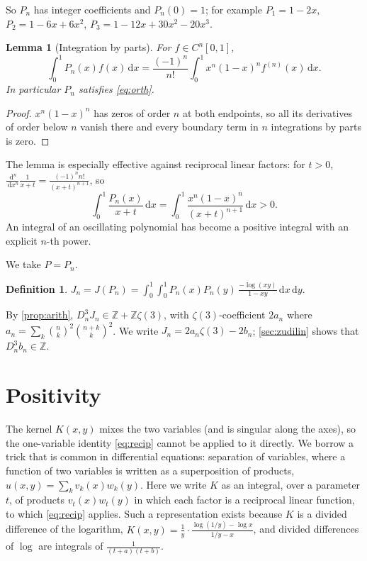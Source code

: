 \documentclass[11pt]{article}
\newcommand{\Z}{\mathbb{Z}}
\newcommand{\dd}{\,\mathrm{d}}
\newcommand{\Dn}{D_n}
\theoremstyle{plain}
\newtheorem{lemma}[theorem]{Lemma}
\theoremstyle{definition}
\newtheorem{definition}[theorem]{Definition}
\theoremstyle{remark}
\begin{document}
So $P_n$ has integer coefficients and $P_n(0)=1$; for example $P_1=1-2x$, $P_2=1-6x+6x^2$,
$P_3=1-12x+30x^2-20x^3$.

\begin{lemma}[Integration by parts]\label{lem:ibp}
For $f\in C^n[0,1]$,
\[
  \int_0^1P_n(x)f(x)\dd x=\frac{(-1)^n}{n!}\int_0^1x^n(1-x)^nf^{(n)}(x)\dd x .
\]
In particular $P_n$ satisfies \eqref{eq:orth}.
\end{lemma}

\begin{proof}
$x^n(1-x)^n$ has zeros of order $n$ at both endpoints, so all its derivatives of order below $n$
vanish there and every boundary term in $n$ integrations by parts is zero.
\end{proof}

The lemma is especially effective against reciprocal linear factors: for $t>0$,
$\frac{\dd^n}{\dd x^n}\frac1{x+t}=\frac{(-1)^nn!}{(x+t)^{n+1}}$, so
\begin{equation}\label{eq:recip}
  \int_0^1\frac{P_n(x)}{x+t}\dd x=\int_0^1\frac{x^n(1-x)^n}{(x+t)^{n+1}}\dd x>0 .
\end{equation}
An integral of an oscillating polynomial has become a positive integral with an explicit $n$-th
power.

We take $P=P_n$.

\begin{definition}
$J_n=J(P_n)=\displaystyle\int_0^1\!\!\int_0^1P_n(x)P_n(y)\,\frac{-\log(xy)}{1-xy}\dd x\dd y.$
\end{definition}

By \cref{prop:arith}, $\Dn^3J_n\in\Z+\Z\zeta(3)$, with $\zeta(3)$-coefficient $2a_n$ where
$a_n=\sum_k\binom nk^2\binom{n+k}k^2$. We write $J_n=2a_n\zeta(3)-2b_n$; \cref{sec:zudilin} shows that
$\Dn^3b_n\in\Z$.

\section{Positivity}\label{sec:positivity}

The kernel $K(x,y)$ mixes the two variables (and is singular along the axes), so the
one-variable identity \eqref{eq:recip} cannot be applied to it directly. We borrow a trick that
is common in differential equations: separation of variables, where a function of two variables is
written as a superposition of products, $u(x,y)=\sum_kv_k(x)w_k(y)$. Here we write $K$ as an integral,
over a parameter $t$, of products $v_t(x)w_t(y)$ in which each factor is a reciprocal linear
function, to which \eqref{eq:recip} applies. Such a representation exists because $K$ is a divided
difference of the logarithm, $K(x,y)=\frac1y\cdot\frac{\log(1/y)-\log x}{1/y-x}$, and divided differences of
$\log$ are integrals of $\frac1{(t+a)(t+b)}$.
\end{document}
